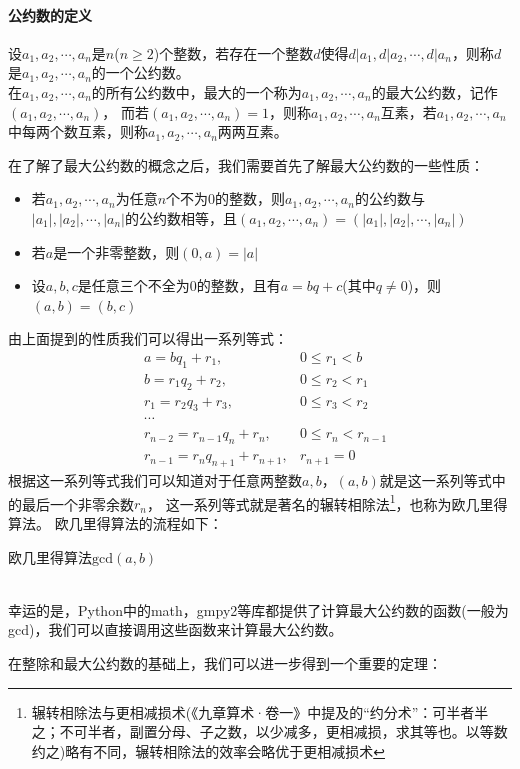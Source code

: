 \documentclass{article}
\numberwithin{equation}{subsubsection}
\begin{document}
\paragraph{\textbf{公约数的定义}}
设$a_1, a_2,\cdots,a_n$是$n$($n\ge2$)个整数，若存在一个整数$d$使得$d|a_1,d|a_2,\cdots,d|a_n$，则称$d$是$a_1,a_2,\cdots,a_n$的一个公约数。\\
在$a_1, a_2,\cdots,a_n$的所有公约数中，最大的一个称为$a_1, a_2,\cdots,a_n$的最大公约数，记作$(a_1,a_2,\cdots,a_n)$，
而若$(a_1,a_2,\cdots,a_n)=1$，则称$a_1, a_2,\cdots,a_n$互素，若$a_1, a_2,\cdots,a_n$中每两个数互素，则称$a_1, a_2,\cdots,a_n$两两互素。\par
在了解了最大公约数的概念之后，我们需要首先了解最大公约数的一些性质：
\begin{itemize}
    \item 若$a_1,a_2,\cdots,a_n$为任意$n$个不为$0$的整数，则$a_1,a_2,\cdots,a_n$的公约数与$|a_1|,|a_2|,\cdots,|a_n|$的公约数相等，且$(a_1,a_2,\cdots,a_n)=(|a_1|,|a_2|,\cdots,|a_n|)$
    \item 若$a$是一个非零整数，则$(0,a)=|a|$
    \item 设$a,b,c$是任意三个不全为$0$的整数，且有$a=bq+c$(其中$q\neq0$)，则$(a,b)=(b,c)$
\end{itemize}
由上面提到的性质我们可以得出一系列等式：
\begin{equation}
\begin{aligned}
    &a=bq_1+r_1,&0\leq r_1 < b\\
    &b=r_1q_2+r_2,&0\leq r_2 < r_1\\
    &r_1=r_2q_3+r_3,&0\leq r_3 < r_2\\
    &\cdots\\
    &r_{n-2}=r_{n-1}q_n+r_n,&0\leq r_n < r_{n-1}\\
    &r_{n-1}=r_nq_{n+1}+r_{n+1},&r_{n+1}=0
\end{aligned}
\end{equation}
根据这一系列等式我们可以知道对于任意两整数$a,b$，$(a,b)$就是这一系列等式中的最后一个非零余数$r_n$，
这一系列等式就是著名的辗转相除法\footnote{辗转相除法与更相减损术(《九章算术·卷一》中提及的“约分术”：可半者半之；不可半者，副置分母、子之数，以少减多，更相减损，求其等也。以等数约之)略有不同，辗转相除法的效率会略优于更相减损术}，也称为欧几里得算法。
欧几里得算法的流程如下：
\begin{algorithm}
    \caption{欧几里得算法$\text{gcd}(a,b)$}
\end{algorithm}\\
幸运的是，Python中的math，gmpy2等库都提供了计算最大公约数的函数(一般为gcd)，我们可以直接调用这些函数来计算最大公约数。\par
在整除和最大公约数的基础上，我们可以进一步得到一个重要的定理：
\end{document}
